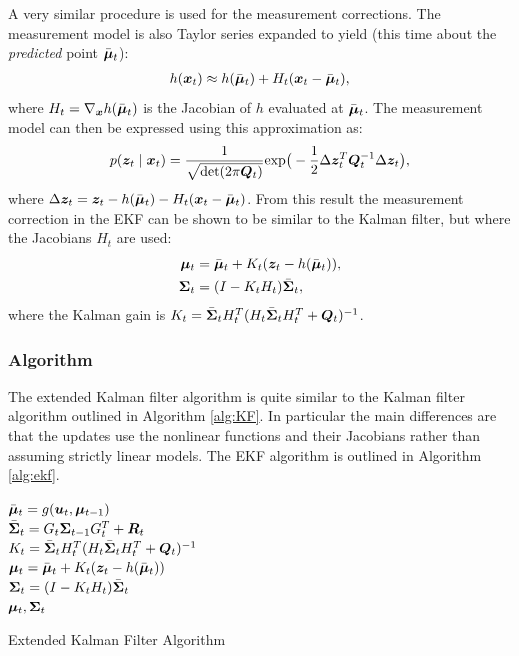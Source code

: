 A very similar procedure is used for the measurement corrections. The measurement model is also Taylor series expanded to yield (this time about the \textit{predicted} point $\bar{\bm{\mu}}_t$):
\begin{equation*}
\begin{split}
h(\bm{x}_t) \approx h(\bar{\bm{\mu}}_t) + H_t (\bm{x}_{t}-\bar{\bm{\mu}}_{t}), \\
\end{split}
\end{equation*}
where $H_t = \nabla_{\bm{x}} h(\bar{\bm{\mu}}_{t})$ is the Jacobian of $h$ evaluated at $\bar{\bm{\mu}}_{t}$. The measurement model can then be expressed using this approximation as:
\begin{equation*}
p(\bm{z}_t \mid \bm{x}_t) = \frac{1}{\sqrt{\text{det}(2\pi \bm{Q}_t)}} \text{exp}\big( -\frac{1}{2}\Delta \bm{z}_t^T \bm{Q}_t^{-1} \Delta \bm{z}_t \big),
\end{equation*}
where $\Delta \bm{z}_t = \bm{z}_t-h(\bar{\bm{\mu}}_t) - H_t (\bm{x}_{t}-\bar{\bm{\mu}}_{t})$. From this result the measurement correction in the EKF can be shown to be similar to the Kalman filter, but where the Jacobians $H_t$ are used:
\begin{equation*}
\begin{split}
\bm{\mu}_t &= \bar{\bm{\mu}}_t + K_t(\bm{z}_t - h(\bar{\bm{\mu}}_{t})), \\
\bm{\Sigma}_t &= (I - K_t H_t)\bar{\bm{\Sigma}}_t,
\end{split}
\end{equation*}
where the Kalman gain is $K_t = \bar{\bm{\Sigma}}_{t}H_t^{T}(H_t\bar{\bm{\Sigma}}_{t}H_t^{T}+\bm{Q}_t)^{-1}$.

\subsubsection{Algorithm}
The extended Kalman filter algorithm is quite similar to the Kalman filter algorithm outlined in Algorithm \ref{alg:KF}. In particular the main differences are that the updates use the nonlinear functions and their Jacobians rather than assuming strictly linear models. The EKF algorithm is outlined in Algorithm \ref{alg:ekf}.
\begin{algorithm}[ht]
 $\bar{\bm{\mu}}_t = g(\bm{u}_t,\bm{\mu}_{t-1})$\\
 $\bar{\bm{\Sigma}}_t = G_t\bm{\Sigma}_{t-1} G_t^{T} + \bm{R}_t$\\
 $K_t = \bar{\bm{\Sigma}}_{t}H_t^{T}(H_t\bar{\bm{\Sigma}}_{t}H_t^{T}+\bm{Q}_t)^{-1}$\\
 $\bm{\mu}_t = \bar{\bm{\mu}}_t + K_t(\bm{z}_t - h(\bar{\bm{\mu}}_{t}))$\\
 $\bm{\Sigma}_t = (I - K_t H_t)\bar{\bm{\Sigma}}_t$\\
 \Return $\bm{\mu}_t, \bm{\Sigma}_t$
 \caption{Extended Kalman Filter Algorithm}
 \label{alg:ekf}
\end{algorithm}

